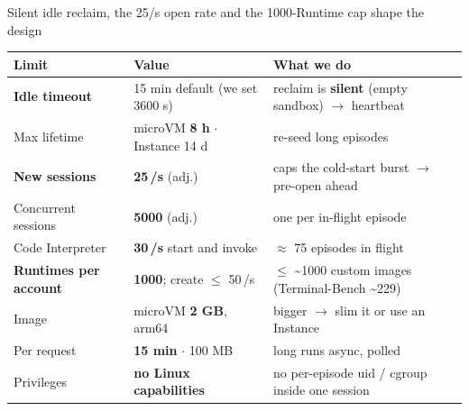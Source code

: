 \begin{frame}{Silent idle reclaim, the 25/s open rate and the 1000-Runtime cap shape the design}
\scriptsize\setlength{\tabcolsep}{4pt}\renewcommand{\arraystretch}{1.02}
\begin{tabularx}{\textwidth}{@{}p{} p{} Y@{}}
\toprule
\textbf{Limit} & \textbf{Value} & \textbf{What we do}\\
\midrule
\textbf{Idle timeout} & 15 min default (we set 3600 s) & reclaim is \textbf{silent} (empty sandbox) $\rightarrow$ heartbeat\\
Max lifetime & microVM \textbf{8 h} $\cdot$ Instance 14 d & re-seed long episodes\\
\textbf{New sessions} & \textbf{25\,/s} (adj.) & caps the cold-start burst $\rightarrow$ pre-open ahead\\
Concurrent sessions & \textbf{5000} (adj.) & one per in-flight episode\\
Code Interpreter & \textbf{30\,/s} start and invoke & $\approx$ 75 episodes in flight\\
\textbf{Runtimes per account} & \textbf{1000}; create $\le$ 50\,/s & $\le$ \textasciitilde1000 custom images (Terminal-Bench \textasciitilde229)\\
Image & microVM \textbf{2 GB}, arm64 & bigger $\rightarrow$ slim it or use an Instance\\
Per request & \textbf{15 min} $\cdot$ 100 MB & long  runs async, polled\\
Privileges & \textbf{no Linux capabilities} & no per-episode uid / cgroup inside one session\\
\bottomrule
\end{tabularx}
\end{frame}


